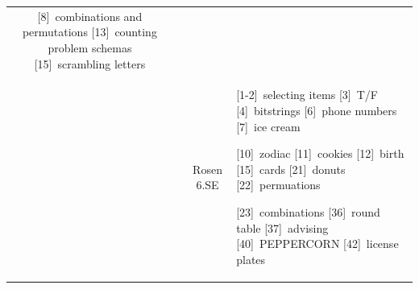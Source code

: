 \documentclass{scrartcl}
\def\hwn#1{\relax}
\def\hwn#1{\ {\tiny (#1)}}
\def\hwn#1{$_{\mbox{\ \tiny #1}}$}
\def\hwn#1{~{\tiny #1}}
\newcommand{\extra}[2][\relax]{[#2]\hwn{#1}}
\begin{document}
\begin{center}
\begin{longtable}{|c|c|c|p{4.3in}|}
	 \extra[combinations and permutations]{8}
	 \extra[counting problem schemas]{13}
	 \extra[scrambling letters]{15}
	 \\
	 & & Rosen 6.SE &
	 \extra[selecting items]{1-2}
	 \extra[T/F]{3}
	 \extra[bitstrings]{4}
	 \extra[phone numbers]{6}
	 \extra[ice cream]{7}

	 \extra[zodiac]{10}
	 \extra[cookies]{11}
	 \extra[birth]{12}
	 \extra[cards]{15}
	 \extra[donuts]{21}
	 \extra[permuations]{22}

	 \extra[combinations]{23}
	 \extra[round table]{36}
	 \extra[advising]{37}
	 \extra[PEPPERCORN]{40}
	 \extra[license plates]{42}
	 \\
	 \hline
\end{longtable}
\end{center}
\label{end}
\end{document}
